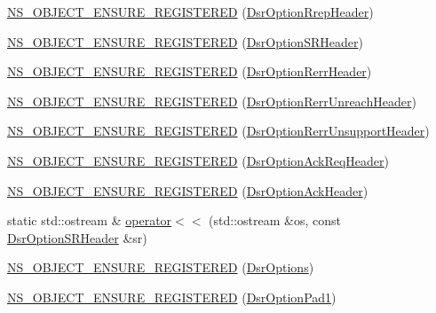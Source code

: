 \begin{DoxyCompactItemize}
\item 
\hyperlink{namespacens3_1_1dsr_af23d495bfe2cf1157a17ffa8a72d6389}{N\+S\+\_\+\+O\+B\+J\+E\+C\+T\+\_\+\+E\+N\+S\+U\+R\+E\+\_\+\+R\+E\+G\+I\+S\+T\+E\+R\+ED} (\hyperlink{classns3_1_1dsr_1_1DsrOptionRrepHeader}{Dsr\+Option\+Rrep\+Header})
\item 
\hyperlink{namespacens3_1_1dsr_a651913af35ebe9906b2efd0c16995fa5}{N\+S\+\_\+\+O\+B\+J\+E\+C\+T\+\_\+\+E\+N\+S\+U\+R\+E\+\_\+\+R\+E\+G\+I\+S\+T\+E\+R\+ED} (\hyperlink{classns3_1_1dsr_1_1DsrOptionSRHeader}{Dsr\+Option\+S\+R\+Header})
\item 
\hyperlink{namespacens3_1_1dsr_a5e6cded82673136c4def23c630e0b17f}{N\+S\+\_\+\+O\+B\+J\+E\+C\+T\+\_\+\+E\+N\+S\+U\+R\+E\+\_\+\+R\+E\+G\+I\+S\+T\+E\+R\+ED} (\hyperlink{classns3_1_1dsr_1_1DsrOptionRerrHeader}{Dsr\+Option\+Rerr\+Header})
\item 
\hyperlink{namespacens3_1_1dsr_aa2b4c8725254c57b0838c95e901b9502}{N\+S\+\_\+\+O\+B\+J\+E\+C\+T\+\_\+\+E\+N\+S\+U\+R\+E\+\_\+\+R\+E\+G\+I\+S\+T\+E\+R\+ED} (\hyperlink{classns3_1_1dsr_1_1DsrOptionRerrUnreachHeader}{Dsr\+Option\+Rerr\+Unreach\+Header})
\item 
\hyperlink{namespacens3_1_1dsr_a90d4886c6571ff461306ab0812c0c00c}{N\+S\+\_\+\+O\+B\+J\+E\+C\+T\+\_\+\+E\+N\+S\+U\+R\+E\+\_\+\+R\+E\+G\+I\+S\+T\+E\+R\+ED} (\hyperlink{classns3_1_1dsr_1_1DsrOptionRerrUnsupportHeader}{Dsr\+Option\+Rerr\+Unsupport\+Header})
\item 
\hyperlink{namespacens3_1_1dsr_abb95d64b13f38269f9751126928ecc80}{N\+S\+\_\+\+O\+B\+J\+E\+C\+T\+\_\+\+E\+N\+S\+U\+R\+E\+\_\+\+R\+E\+G\+I\+S\+T\+E\+R\+ED} (\hyperlink{classns3_1_1dsr_1_1DsrOptionAckReqHeader}{Dsr\+Option\+Ack\+Req\+Header})
\item 
\hyperlink{namespacens3_1_1dsr_a2ddbb9a3b55fd4728f1ca7a2f8cdaea5}{N\+S\+\_\+\+O\+B\+J\+E\+C\+T\+\_\+\+E\+N\+S\+U\+R\+E\+\_\+\+R\+E\+G\+I\+S\+T\+E\+R\+ED} (\hyperlink{classns3_1_1dsr_1_1DsrOptionAckHeader}{Dsr\+Option\+Ack\+Header})
\item 
static std\+::ostream \& \hyperlink{namespacens3_1_1dsr_a2c17213207d836351d0c0808745d0b94}{operator$<$$<$} (std\+::ostream \&os, const \hyperlink{classns3_1_1dsr_1_1DsrOptionSRHeader}{Dsr\+Option\+S\+R\+Header} \&sr)
\item 
\hyperlink{namespacens3_1_1dsr_a41b919327c686c03cff149231c9e2d7e}{N\+S\+\_\+\+O\+B\+J\+E\+C\+T\+\_\+\+E\+N\+S\+U\+R\+E\+\_\+\+R\+E\+G\+I\+S\+T\+E\+R\+ED} (\hyperlink{classns3_1_1dsr_1_1DsrOptions}{Dsr\+Options})
\item 
\hyperlink{namespacens3_1_1dsr_a595893a0a36cf23f4e35ae8d5742da5b}{N\+S\+\_\+\+O\+B\+J\+E\+C\+T\+\_\+\+E\+N\+S\+U\+R\+E\+\_\+\+R\+E\+G\+I\+S\+T\+E\+R\+ED} (\hyperlink{classns3_1_1dsr_1_1DsrOptionPad1}{Dsr\+Option\+Pad1})

\end{DoxyCompactItemize}
